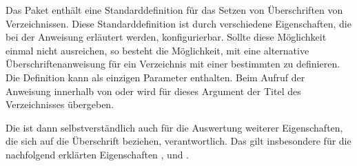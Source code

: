 \begin{Declaration}
\end{Declaration}
Das Paket  enthält eine Standarddefinition für das Setzen
von Überschriften von Verzeichnissen. Diese Standarddefinition ist durch
verschiedene Eigenschaften, die bei der Anweisung
 erläutert werden, konfigurierbar. Sollte
diese Möglichkeit einmal nicht ausreichen, so besteht die Möglichkeit, mit
 eine alternative Überschriftenanweisung für ein
Verzeichnis mit einer bestimmten  zu definieren. Die
Definition kann als einzigen Parameter  enthalten. Beim Aufruf der
Anweisung innerhalb von  oder
 wird für dieses Argument der Titel
des Verzeichnisses übergeben.

Die  ist dann selbstverständlich auch für die Auswertung
weiterer Eigenschaften, die sich auf die Überschrift beziehen,
verantwortlich. Das gilt insbesondere für die nachfolgend erklärten
Eigenschaften ,  und .%
\EndIndexGroup


